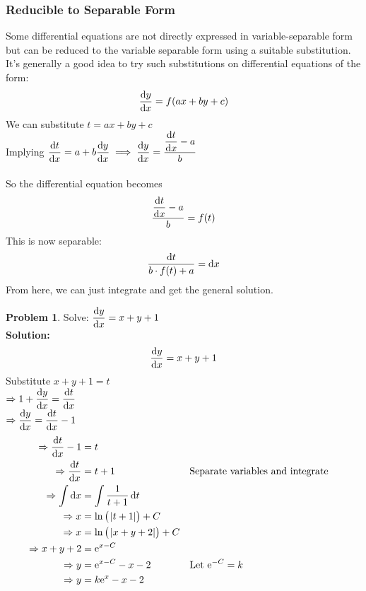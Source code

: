 \documentclass[14]{article}
\theoremstyle{definition}
\newtheorem{prob}{Problem}
\theoremstyle{case}
\begin{document}
\subsubsection{Reducible to Separable Form}
Some differential equations are not directly expressed in variable-separable form but can be reduced to the variable separable form using a suitable substitution.\\
It's generally a good idea to try such substitutions on differential equations of the form:
\[\dfrac{\dif y}{\dif x} = f(ax+by+c)\]
We can substitute $t = ax + by  + c$\\
Implying $\dfrac{\dif t}{\dif x} = a + b \dfrac{\dif y}{\dif x} \implies \dfrac{\dif y}{\dif x} = \dfrac{\dfrac{\dif t}{\dif x} - a}{b}$\\\\
So the differential equation becomes
\[\dfrac{\dfrac{\dif t}{\dif x} - a}{b} = f(t)\]
This is now separable:
\[\dfrac{\dif t}{b\cdot f(t) + a} = \dif x\]
From here, we can just integrate and get the general solution.
\begin{prob}
Solve: $\dfrac{\dif y}{\dif x} = x+y+1$\\
\textbf{Solution:}\\
\[\dfrac{\dif y}{\dif x} = x+y+1\]
Substitute $x + y + 1 = t$\\
$\Rightarrow 1 + \dfrac{\dif y}{\dif x} = \dfrac{\dif t}{\dif x}$\\
$\Rightarrow \dfrac{\dif y}{\dif x} = \dfrac{\dif t}{\dif x} - 1$\\
\begin{align*}
\Rightarrow \dfrac{\dif t}{\dif x} - 1 &= t\\
\Rightarrow \dfrac{\dif t}{\dif x} &= t + 1 && \text{Separate variables and integrate}\\
\Rightarrow \int\dif x &= \int \dfrac1{t+1} \dif t\\
\Rightarrow x &= \ln\left(\;\abs{t+1}\right) + C\\
\Rightarrow x&= \ln\left(\;\abs{x+y+2}\right) + C\\
\Rightarrow x+y+2 &=  {\rm e}^{x-C}\\
\Rightarrow y &= {\rm e}^{x - C} - x - 2 && \text{Let } {\rm e}^{-C} = k\\
\Rightarrow y &= k{\rm e}^x - x - 2
\end{align*}
\end{prob}
\pagebreak
\end{document}
